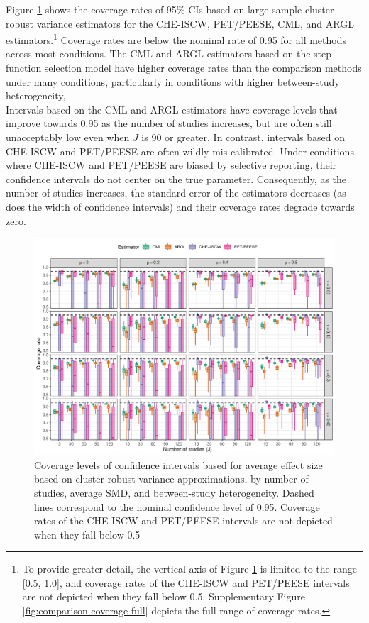 \documentclass[
  american,
  man, donotrepeattitle,floatsintext]{apa7}
\begin{document}
Figure \ref{fig:comparison-coverage} shows the coverage rates of 95\% CIs based on large-sample cluster-robust variance estimators for the CHE-ISCW, PET/PEESE, CML, and ARGL estimators.\footnote{To provide greater detail, the vertical axis of Figure \ref{fig:comparison-coverage} is limited to the range {[}0.5, 1.0{]}, and coverage rates of the CHE-ISCW and PET/PEESE intervals are not depicted when they fall below 0.5. Supplementary Figure \ref{fig:comparison-coverage-full} depicts the full range of coverage rates.}
Coverage rates are below the nominal rate of 0.95 for all methods across most conditions.
The CML and ARGL estimators based on the step-function selection model have higher coverage rates than the comparison methods under many conditions, particularly in conditions with higher between-study heterogeneity,\\
Intervals based on the CML and ARGL estimators have coverage levels that improve towards 0.95 as the number of studies increases, but are often still unacceptably low even when \(J\) is 90 or greater.
In contrast, intervals based on CHE-ISCW and PET/PEESE are often wildly mis-calibrated.
Under conditions where CHE-ISCW and PET/PEESE are biased by selective reporting, their confidence intervals do not center on the true parameter. Consequently, as the number of studies increases, the standard error of the estimators decreases (as does the width of confidence intervals) and their coverage rates degrade towards zero.

\begin{figure}
\includegraphics{step-function-selection-models-with-dependent-effects_files/figure-latex/comparison-coverage-1} \caption{Coverage levels of confidence intervals based for average effect size based on cluster-robust variance approximations, by number of studies, average SMD, and between-study heterogeneity. Dashed lines correspond to the nominal confidence level of 0.95. Coverage rates of the CHE-ISCW and PET/PEESE intervals are not depicted when they fall below 0.5}\label{fig:comparison-coverage}
\end{figure}
\end{document}

